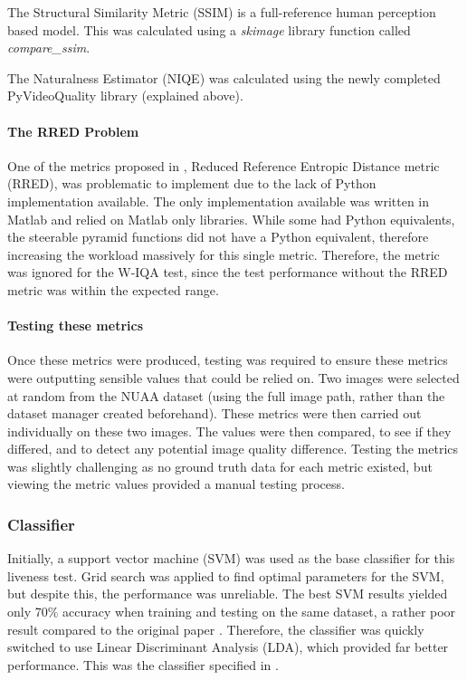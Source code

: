 \documentclass[12pt,a4paper]{article}
\begin{document}
                The Structural Similarity Metric (SSIM) is a full-reference human perception based model. This was calculated using a \emph{skimage} library function called \emph{compare\_ssim}. 

                The Naturalness Estimator (NIQE) was calculated using the newly completed PyVideoQuality library (explained above).

            \paragraph{The RRED Problem}
            One of the metrics proposed in \cite{ImageQualityAssessmentTest}, Reduced Reference Entropic Distance metric (RRED), was problematic to implement due to the lack of Python implementation available.
            The only implementation available was written in Matlab and relied on Matlab only libraries. While some had Python equivalents, the steerable pyramid functions did not have a Python equivalent, therefore increasing the workload massively for this single metric. Therefore, the metric was ignored for the W-IQA
            test, since the test performance without the RRED metric was within the expected range. 
            
            \paragraph{Testing these metrics}
            Once these metrics were produced, testing was required to ensure these metrics were outputting sensible values that could be relied on.
            Two images were selected at random from the NUAA dataset (using the full image path, rather than the dataset manager created beforehand). These metrics were then carried out individually on these two images. The values were then compared, to see if they differed, and to detect any potential image quality difference. 
            Testing the metrics was slightly challenging as no ground truth data for each metric existed, but viewing the metric values provided a manual testing process.


        \subsubsection{Classifier}
            Initially, a support vector machine (SVM) was used as the base classifier for this liveness test. Grid search was applied to find optimal parameters for the SVM, but despite this, the performance was unreliable. The best SVM results yielded only 70\% accuracy when training and testing on the same dataset, a rather poor result compared to the original paper \cite{ImageQualityAssessmentTest}. Therefore, the classifier was quickly switched to use Linear Discriminant Analysis (LDA), which provided far better performance. This was the classifier specified in \cite{ImageQualityAssessmentTest}.
\end{document}
